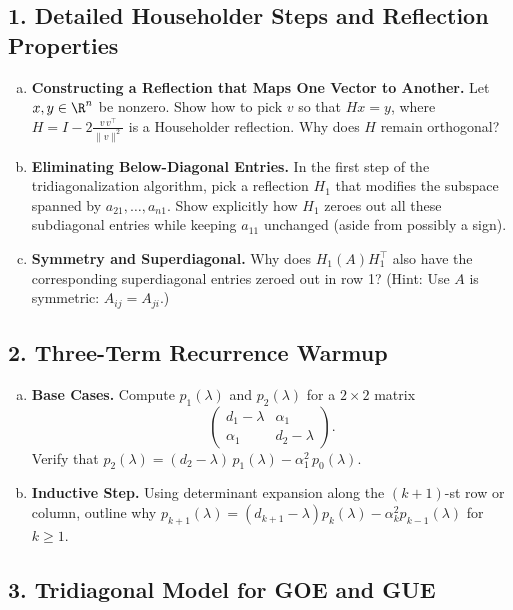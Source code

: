 \documentclass[letterpaper,11pt,oneside,reqno]{article}
\numberwithin{equation}{section}
\theoremstyle{definition}
\begin{document}
\subsection*{1. Detailed Householder Steps and Reflection Properties}

\begin{enumerate}[(a)]
\item {\bf Constructing a Reflection that Maps One Vector to Another.}
  Let $x,y\in \R^n$ be nonzero. Show how to pick $v$ so that $Hx=y$, where $H=I-2\frac{v\,v^\top}{\|v\|^2}$ is a Householder reflection. Why does $H$ remain orthogonal?
\item {\bf Eliminating Below-Diagonal Entries.}
  In the first step of the tridiagonalization algorithm, pick a reflection $H_1$ that modifies the subspace spanned by $a_{21},\dots,a_{n1}$. Show explicitly how $H_1$ zeroes out all these subdiagonal entries while keeping $a_{11}$ unchanged (aside from possibly a sign).
\item {\bf Symmetry and Superdiagonal.}
  Why does $H_1 (A) H_1^\top$ also have the corresponding superdiagonal entries zeroed out in row 1? (Hint: Use $A$ is symmetric: $A_{ij}=A_{ji}$.)
\end{enumerate}

\subsection*{2. Three-Term Recurrence Warmup}

\begin{enumerate}[(a)]
\item {\bf Base Cases.} Compute $p_1(\lambda)$ and $p_2(\lambda)$ for a $2\times2$ matrix
\[
  \begin{pmatrix}
    d_1-\lambda & \alpha_1 \\
    \alpha_1 & d_2-\lambda
  \end{pmatrix}.
\]
Verify that $p_2(\lambda) = (d_2-\lambda)\,p_1(\lambda) - \alpha_1^2\,p_0(\lambda)$.
\item {\bf Inductive Step.} Using determinant expansion along the $(k+1)$-st row or column, outline why $p_{k+1}(\lambda) = (d_{k+1}-\lambda)p_k(\lambda) - \alpha_k^2 p_{k-1}(\lambda)$ for $k\ge1$.
\end{enumerate}

\subsection*{3. Tridiagonal Model for GOE and GUE}
\end{document}
